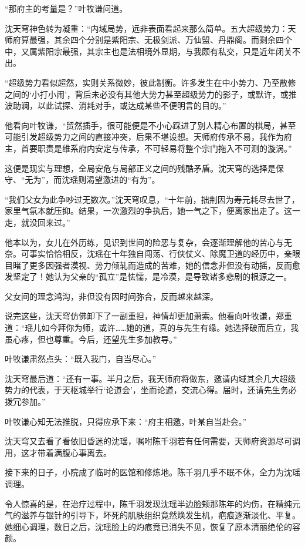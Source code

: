 “那府主的考量是？”叶牧谦问道。

沈天穹神色转为凝重：“内域局势，远非表面看起来那么简单。五大超级势力：天师府算最强，其余四个分别是紫阳宗、无极剑派、万仙盟、丹鼎阁。而剩余四个中，又属紫阳宗最强，其宗主也是法相境外显期，与我颇有私交，只是近年闭关不出。

“超级势力看似超然，实则关系微妙，彼此制衡。许多发生在中小势力、乃至散修之间的‘小打小闹’，背后未必没有其他大势力甚至超级势力的影子，或默许，或推波助澜，以此试探、消耗对手，或达成某些不便明言的目的。”

他看向叶牧谦，“贸然插手，很可能便是不小心踩进了别人精心布置的棋局，甚至可能引发超级势力之间的直接冲突，后果不堪设想。天师府传承不易，我作为府主，首要职责是维系府内安定与传承，不可轻易将整个宗门拖入不可测的漩涡。”

这便是现实与理想，全局安危与局部正义之间的残酷矛盾。沈天穹的选择是保守、“无为”，而沈瑶则渴望激进的“有为”。

“我们父女为此争吵过无数次。”沈天穹叹息，“十年前，拙荆因为寿元耗尽去世了，家里气氛本就压抑。结果，一次激烈的争执后，她一气之下，便离家出走了。这一走，就没回来过。”

他本以为，女儿在外历练，见识到世间的险恶与复杂，会逐渐理解他的苦心与无奈。可事实恰恰相反，沈瑶在十年独自闯荡、行侠仗义、除魔卫道的经历中，亲眼目睹了更多因强者漠视、势力倾轧而造成的苦难，她的信念非但没有动摇，反而愈发坚定了！她认为父亲的“孤立”是怯懦，是冷漠，是导致诸多悲剧的根源之一。

父女间的理念鸿沟，非但没有因时间弥合，反而越来越深。

说完这些，沈天穹仿佛卸下了一副重担，神情却更加萧索。他看向叶牧谦，郑重道：“瑶儿如今拜你为师，或许……她的道，真的与先生有缘。她选择破而后立，我虽心疼，但也尊重。今后，还望先生多加教导。”

叶牧谦肃然点头：“既入我门，自当尽心。”

沈天穹最后道：“还有一事。半月之后，我天师府将做东，邀请内域其余几大超级势力的代表，于天枢城举行‘论道会’，坐而论道，交流心得。届时，还请先生务必拨冗参加。”

叶牧谦心知无法推脱，只得应承下来：“府主相邀，叶某自当赴会。”

沈天穹又去看了看依旧昏迷的沈瑶，嘱咐陈千羽若有任何需要，天师府资源尽可调用，这才带着满腹心事离去。

\vspace{2em}

接下来的日子，小院成了临时的医馆和修炼地。陈千羽几乎不眠不休，全力为沈瑶调理。

令人惊喜的是，在治疗过程中，陈千羽发现沈瑶半边脸颊那陈年的灼伤，在精纯元气的滋养与银针的引导下，坏死的肌肤组织竟然焕发生机，疤痕逐渐淡化、平复。她细心调理，数日之后，沈瑶脸上的灼痕竟已消失不见，恢复了原本清丽绝伦的容颜。

